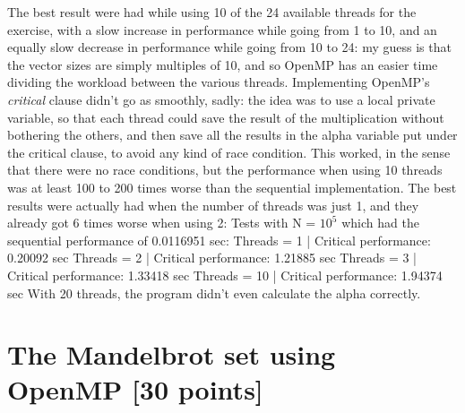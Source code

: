 \documentclass[unicode,11pt,a4paper,oneside,numbers=endperiod,openany]{scrartcl}
\begin{document}
\newline
\newline
The best result were had while using 10 of the 24 available threads for the exercise, with a slow increase in performance while going from 1 to 10, and an equally slow decrease in performance while going from 10 to 24: my guess is that the vector sizes are simply multiples of 10, and so OpenMP has an easier time dividing the workload between the various threads.
\newline
\newline
Implementing OpenMP's \textit{critical} clause didn't go as smoothly, sadly: the idea was to use a local private variable, so that each thread could save the result of the multiplication without bothering the others, and then save all the results in the alpha variable put under the critical clause, to avoid any kind of race condition. This worked, in the sense that there were no race conditions, but the performance when using 10 threads was at least 100 to 200 times worse than the sequential implementation. The best results were actually had when the number of threads was just 1, and they already got 6 times worse when using 2:
\newline
\newline
Tests with N = $10^{5}$ which had the sequential performance of 0.0116951 sec:
\newline
\newline
Threads = 1 | Critical performance: 0.20092 sec
\newline
Threads = 2 | Critical performance: 1.21885 sec
\newline
Threads = 3 | Critical performance: 1.33418 sec
\newline
Threads = 10 | Critical performance: 1.94374 sec
\newline
\newline
With 20 threads, the program didn't even calculate the alpha correctly.


\section{The Mandelbrot set using OpenMP [30 points]}
\end{document}
